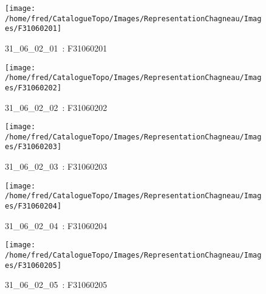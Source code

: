 \documentclass[12pt,titlepage,oneside]{book}
\begin{document}
\begin{figure}[h!]
  \hfill         %
  \begin{minipage}[t]{3cm}
    \begin{center}
      \texttt{[image: /home/fred/CatalogueTopo/Images/RepresentationChagneau/Images/F31060201]}
      \caption[~31\_06\_02\_01]{\small{31\_06\_02\_01~:} \tiny{F31060201}}\label{F31060201}
    \end{center}
  \end{minipage}
  \begin{minipage}[t]{3cm}
    \begin{center}
      \texttt{[image: /home/fred/CatalogueTopo/Images/RepresentationChagneau/Images/F31060202]}
      \caption[~31\_06\_02\_02]{\small{31\_06\_02\_02~:} \tiny{F31060202}}\label{F31060202}
    \end{center}
  \end{minipage}
  \begin{minipage}[t]{3cm}
    \begin{center}
      \texttt{[image: /home/fred/CatalogueTopo/Images/RepresentationChagneau/Images/F31060203]}
      \caption[~31\_06\_02\_03]{\small{31\_06\_02\_03~:} \tiny{F31060203}}\label{F31060203}
    \end{center}
  \end{minipage}
  \begin{minipage}[t]{3cm}
    \begin{center}
      \texttt{[image: /home/fred/CatalogueTopo/Images/RepresentationChagneau/Images/F31060204]}
      \caption[~31\_06\_02\_04]{\small{31\_06\_02\_04~:} \tiny{F31060204}}\label{F31060204}
    \end{center}
  \end{minipage}
  \begin{minipage}[t]{3cm}
    \begin{center}
      \texttt{[image: /home/fred/CatalogueTopo/Images/RepresentationChagneau/Images/F31060205]}
      \caption[~31\_06\_02\_05]{\small{31\_06\_02\_05~:} \tiny{F31060205}}\label{F31060205}
    \end{center}
  \end{minipage}
\end{figure}
\end{document}

